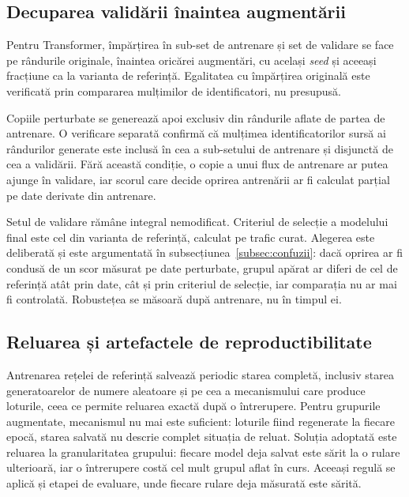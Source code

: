 \subsection{Decuparea validării înaintea augmentării}\label{subsec:implsplit}

Pentru Transformer, împărțirea în sub-set de antrenare și set de validare se face pe rândurile originale, înaintea oricărei augmentări, cu același \textit{seed} și aceeași fracțiune ca la varianta de referință. Egalitatea cu împărțirea originală este verificată prin compararea mulțimilor de identificatori, nu presupusă.

Copiile perturbate se generează apoi exclusiv din rândurile aflate de partea de antrenare. O verificare separată confirmă că mulțimea identificatorilor sursă ai rândurilor generate este inclusă în cea a sub-setului de antrenare și disjunctă de cea a validării. Fără această condiție, o copie a unui flux de antrenare ar putea ajunge în validare, iar scorul care decide oprirea antrenării ar fi calculat parțial pe date derivate din antrenare.

Setul de validare rămâne integral nemodificat. Criteriul de selecție a modelului final este cel din varianta de referință, calculat pe trafic curat. Alegerea este deliberată și este argumentată în subsecțiunea~\ref{subsec:confuzii}: dacă oprirea ar fi condusă de un scor măsurat pe date perturbate, grupul apărat ar diferi de cel de referință atât prin date, cât și prin criteriul de selecție, iar comparația nu ar mai fi controlată. Robustețea se măsoară după antrenare, nu în timpul ei.

\subsection{Reluarea și artefactele de reproductibilitate}\label{subsec:implreluare}

Antrenarea rețelei de referință salvează periodic starea completă, inclusiv starea generatoarelor de numere aleatoare și pe cea a mecanismului care produce loturile, ceea ce permite reluarea exactă după o întrerupere. Pentru grupurile augmentate, mecanismul nu mai este suficient: loturile fiind regenerate la fiecare epocă, starea salvată nu descrie complet situația de reluat. Soluția adoptată este reluarea la granularitatea grupului: fiecare model deja salvat este sărit la o rulare ulterioară, iar o întrerupere costă cel mult grupul aflat în curs. Aceeași regulă se aplică și etapei de evaluare, unde fiecare rulare deja măsurată este sărită.

